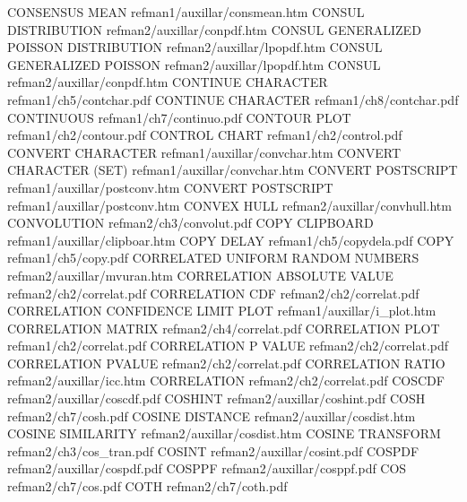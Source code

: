 CONSENSUS MEAN                          refman1/auxillar/consmean.htm
CONSUL DISTRIBUTION                     refman2/auxillar/conpdf.htm
CONSUL GENERALIZED POISSON DISTRIBUTION refman2/auxillar/lpopdf.htm
CONSUL GENERALIZED POISSON              refman2/auxillar/lpopdf.htm
CONSUL                                  refman2/auxillar/conpdf.htm
CONTINUE CHARACTER                      refman1/ch5/contchar.pdf
CONTINUE CHARACTER                      refman1/ch8/contchar.pdf
CONTINUOUS                              refman1/ch7/continuo.pdf
CONTOUR PLOT                            refman1/ch2/contour.pdf
CONTROL CHART                           refman1/ch2/control.pdf
CONVERT CHARACTER                       refman1/auxillar/convchar.htm
CONVERT CHARACTER (SET)                 refman1/auxillar/convchar.htm
CONVERT POSTSCRIPT                      refman1/auxillar/postconv.htm
CONVERT POSTSCRIPT                      refman1/auxillar/postconv.htm
CONVEX HULL                             refman2/auxillar/convhull.htm
CONVOLUTION                             refman2/ch3/convolut.pdf
COPY CLIPBOARD                          refman1/auxillar/clipboar.htm
COPY DELAY                              refman1/ch5/copydela.pdf
COPY                                    refman1/ch5/copy.pdf
CORRELATED UNIFORM RANDOM NUMBERS       refman2/auxillar/mvuran.htm
CORRELATION ABSOLUTE VALUE              refman2/ch2/correlat.pdf
CORRELATION CDF                         refman2/ch2/correlat.pdf
CORRELATION CONFIDENCE LIMIT PLOT       refman1/auxillar/i_plot.htm
CORRELATION MATRIX                      refman2/ch4/correlat.pdf
CORRELATION PLOT                        refman1/ch2/correlat.pdf
CORRELATION P VALUE                     refman2/ch2/correlat.pdf
CORRELATION PVALUE                      refman2/ch2/correlat.pdf
CORRELATION RATIO                       refman2/auxillar/icc.htm
CORRELATION                             refman2/ch2/correlat.pdf
COSCDF                                  refman2/auxillar/coscdf.pdf
COSHINT                                 refman2/auxillar/coshint.pdf
COSH                                    refman2/ch7/cosh.pdf
COSINE DISTANCE                         refman2/auxillar/cosdist.htm
COSINE SIMILARITY                       refman2/auxillar/cosdist.htm
COSINE TRANSFORM                        refman2/ch3/cos_tran.pdf
COSINT                                  refman2/auxillar/cosint.pdf
COSPDF                                  refman2/auxillar/cospdf.pdf
COSPPF                                  refman2/auxillar/cosppf.pdf
COS                                     refman2/ch7/cos.pdf
COTH                                    refman2/ch7/coth.pdf
